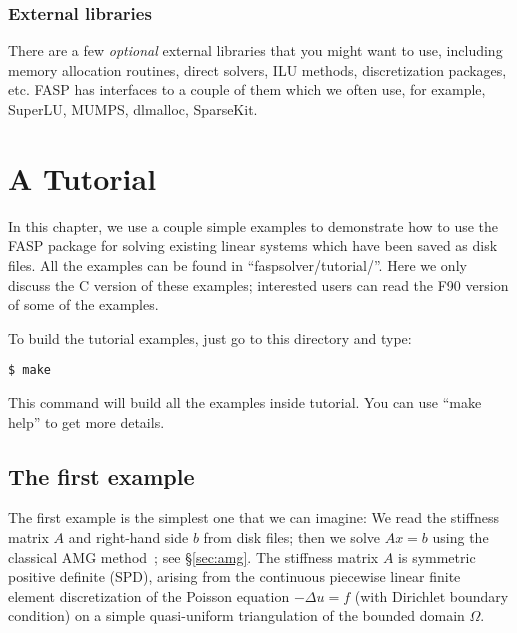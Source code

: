 \documentclass[11pt]{memoir}
\begin{document}
\subsection{External libraries}\label{ssec:lib}

There are a few \emph{optional} external libraries that you might want to use, including memory allocation routines, direct solvers, ILU methods, discretization packages, etc. FASP has interfaces to a couple of them which we often use, for example, SuperLU, MUMPS, dlmalloc, SparseKit. 


\chapter{A Tutorial}\label{ch:tutor}

In this chapter, we use a couple simple examples to demonstrate how to use the FASP package for solving existing linear systems which have been saved as disk files. All the examples can be found in ``faspsolver/tutorial/''. Here we only discuss the C version of these examples; interested users can read the F90 version of some of the examples.

To build the tutorial examples, just go to this directory and type:
%
\begin{lstlisting}[numbers=none]
$ make
\end{lstlisting}
%
This command will build all the examples inside tutorial. You can use ``make help'' to get more details. 


\section{The first example}\label{sec:ex1}

The first example is the simplest one that we can imagine: We read the stiffness matrix $A$ and right-hand side $b$ from disk files; then we solve $Ax=b$ using the classical AMG method~\cite{Brandt.BrandtMcCormick.1982uq,Ruge.RugeStuben.1985ij,Ruge.RugeStuben.1987bs}; see \S\ref{sec:amg}. The stiffness matrix $A$ is symmetric positive definite (SPD), arising from the continuous piecewise linear finite element discretization of the Poisson equation $-\Delta u = f$ (with Dirichlet boundary condition) on a simple quasi-uniform triangulation of the bounded domain $\Omega$. 
 
\end{document}
